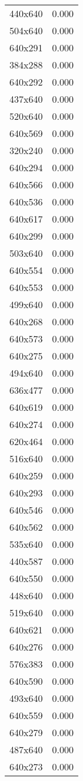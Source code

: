 \begin{table}
\begin{tabular}{lr}
440x640 & 0.000 \\
504x640 & 0.000 \\
640x291 & 0.000 \\
384x288 & 0.000 \\
640x292 & 0.000 \\
437x640 & 0.000 \\
520x640 & 0.000 \\
640x569 & 0.000 \\
320x240 & 0.000 \\
640x294 & 0.000 \\
640x566 & 0.000 \\
640x536 & 0.000 \\
640x617 & 0.000 \\
640x299 & 0.000 \\
503x640 & 0.000 \\
640x554 & 0.000 \\
640x553 & 0.000 \\
499x640 & 0.000 \\
640x268 & 0.000 \\
640x573 & 0.000 \\
640x275 & 0.000 \\
494x640 & 0.000 \\
636x477 & 0.000 \\
640x619 & 0.000 \\
640x274 & 0.000 \\
620x464 & 0.000 \\
516x640 & 0.000 \\
640x259 & 0.000 \\
640x293 & 0.000 \\
640x546 & 0.000 \\
640x562 & 0.000 \\
535x640 & 0.000 \\
440x587 & 0.000 \\
640x550 & 0.000 \\
448x640 & 0.000 \\
519x640 & 0.000 \\
640x621 & 0.000 \\
640x276 & 0.000 \\
576x383 & 0.000 \\
640x590 & 0.000 \\
493x640 & 0.000 \\
640x559 & 0.000 \\
640x279 & 0.000 \\
487x640 & 0.000 \\
640x273 & 0.000 \\

\end{tabular}
\end{table}
